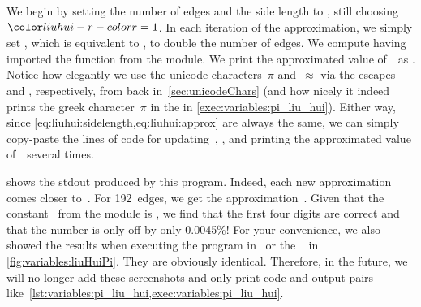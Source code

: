 We begin by setting the number of edges  and the side length to , still choosing~$\liuhuir=1$.
In each iteration of the approximation, we simply set \pythonIdx{*=}, which is equivalent to , to double the number of edges.
We compute  having imported the  function from the  module.
We print the approximated value of~\numberPi\ as .
Notice how elegantly we use the unicode characters~$\pi$ and~$\approx$ via the escapes~ and , respectively, from back in~\cref{sec:unicodeChars} (and how nicely it indeed prints the greek character~$\pi$ in the  in \cref{exec:variables:pi_liu_hui}).
Either way, since \cref{eq:liuhui:sidelength,eq:liuhui:approx} are always the same, we can simply copy-paste the lines of code for updating~, , and printing the approximated value of~\numberPi\ several times.

 shows the \acrfull{stdout} produced by this program.
Indeed, each new approximation comes closer to~\numberPi.
For 192~edges, we get the approximation~.
Given that the constant~ from the  module is , we find that the first four digits are correct and that the number is only off by only 0.0045\%!
For your convenience, we also showed the results when executing the program in \pycharm\ or the \ubuntu\  in \cref{fig:variables:liuHuiPi}.
They are obviously identical.
Therefore, in the future, we will no longer add these screenshots and only print code and output pairs like~\cref{lst:variables:pi_liu_hui,exec:variables:pi_liu_hui}.%
%
\endhsection%
%
\FloatBarrier%
\endhsection%
%
